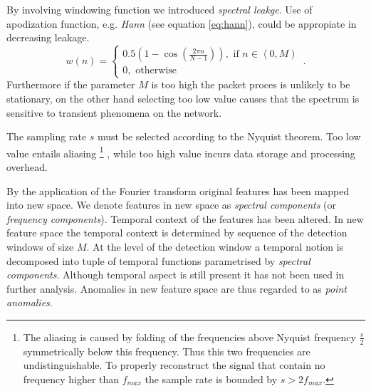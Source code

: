 By involving windowing function we introduced
\emph{spectral leakge}. Use of apodization function, e.g. \emph{Hann} %
(see equation \ref{eq:hann}),
could be appropiate in decreasing leakage.
\begin{equation}\label{eq:hann}
w(n) = \left\lbrace \begin{array}{l} 
0.5\left(1 - \cos \left ( \frac{2 \pi n}{N-1} \right) \right), \mbox{ if } n\in \left\langle 
0, M \right) \\ 0, \mbox{ otherwise} \end{array}\right. \,.
\end{equation}
Furthermore if the parameter $M$ is too high the packet proces is unlikely to be stationary, 
on the other hand selecting too low value causes that the spectrum is sensitive
to transient phenomena on the network. %

The sampling rate $s$ must be selected according to the Nyquist theorem. 
Too low value entails aliasing%
\footnote{The aliasing is caused by folding of the frequencies above Nyquist frequency
$\frac{s}{2}$ symmetrically below this frequency. Thus this two frequencies are undistinguishable.
To properly reconstruct the signal that contain no frequency higher than $f_{max}$ 
the sample rate is bounded by $s > 2f_{max}$.}%
, while too high value incurs data storage and processing overhead. 

By the application of the Fourier transform original features has been mapped into new space.
We denote features in new space as \emph{spectral components} (or \emph{frequency components}).
Temporal context of the features has been altered. 
In new feature space the temporal context is determined by sequence
of the detection windows of size $M$. 
At the level of the detection window a temporal notion is decomposed 
into tuple of temporal functions parametrised by \emph{spectral components}.
Although temporal aspect is still present it has not been used in further analysis.
Anomalies in new feature space are thus regarded to as \emph{point anomalies}. %


